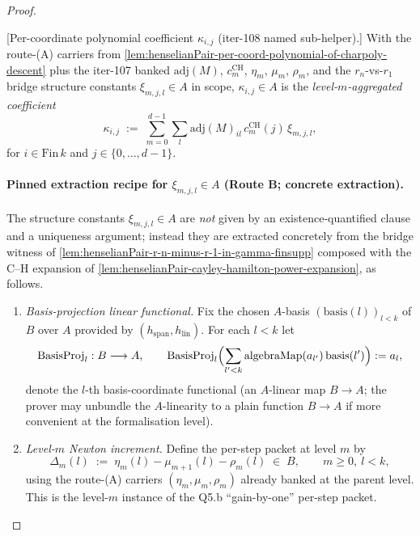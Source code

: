 \begin{proof}
\begin{definition}
\label{def:henselianPair-kappa-coefficient}
[Per-coordinate polynomial coefficient $\kappa_{i,j}$
(iter-108 named sub-helper).]
With the route-(A) carriers from
\cref{lem:henselianPair-per-coord-polynomial-of-charpoly-descent}
plus the iter-107 banked $\mathrm{adj}(M)$,
$c^{\mathrm{CH}}_m$, $\eta_m$, $\mu_m$, $\rho_m$, and the
$r_n$-vs-$r_1$ bridge structure constants
$\xi_{m,j,l} \in A$ in scope, $\kappa_{i,j} \in A$ is the
\emph{level-$m$-aggregated coefficient}
\[
\kappa_{i,j} \;:=\;
\sum_{m = 0}^{d - 1} \sum_l
\mathrm{adj}(M)_{il}\,c^{\mathrm{CH}}_m(j)\,\xi_{m,j,l},
\]
for $i \in \mathrm{Fin}\,k$ and $j \in \{0, \ldots, d - 1\}$.

\paragraph{Pinned extraction recipe for $\xi_{m,j,l} \in A$
(Route B; concrete extraction).} The structure constants
$\xi_{m,j,l} \in A$ are \emph{not} given by an
existence-quantified clause and a uniqueness argument; instead
they are extracted concretely from the bridge witness of
\cref{lem:henselianPair-r-n-minus-r-1-in-gamma-finsupp} composed
with the C--H expansion of
\cref{lem:henselianPair-cayley-hamilton-power-expansion}, as
follows.

\begin{enumerate}
\item \emph{Basis-projection linear functional.} Fix the chosen
$A$-basis $(\mathrm{basis}(l))_{l < k}$ of $B$ over $A$ provided
by $(h_{\mathrm{span}}, h_{\mathrm{lin}})$. For each $l < k$ let
\[
\mathrm{BasisProj}_l : B \longrightarrow A,
\qquad
\mathrm{BasisProj}_l \Bigl(\sum_{l' < k}
\mathrm{algebraMap}(a_{l'})\,\mathrm{basis}(l')\Bigr) := a_l,
\]
denote the $l$-th basis-coordinate functional (an $A$-linear
map $B \to A$; the prover may unbundle the
$A$-linearity to a plain function $B \to A$ if more convenient
at the formalisation level).

\item \emph{Level-$m$ Newton increment.} Define the
per-step packet at level $m$ by
\[
\Delta_m(l) \;:=\; \eta_m(l) - \mu_{m+1}(l) - \rho_m(l) \;\in\; B,
\qquad m \ge 0,\ l < k,
\]
using the route-(A) carriers $(\eta_m, \mu_m, \rho_m)$ already
banked at the parent level. This is the level-$m$ instance of
the Q5.b ``gain-by-one'' per-step packet.


\end{enumerate}
\end{definition}
\end{proof}
